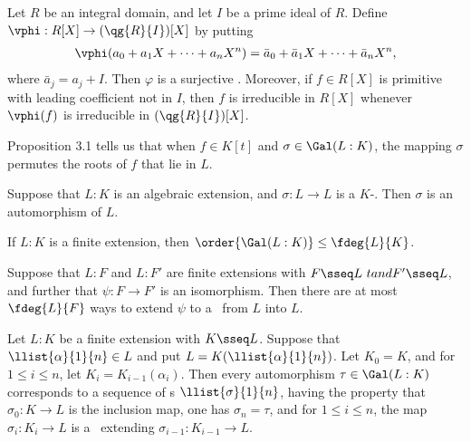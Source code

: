 \documentclass[a4paper]{article}
\begin{document}
\begin{ttheorem}
  Let \( R \) be an integral domain, and let \( I \) be a prime ideal of \( R \).
  Define \( \vphi:R[X]\to (\qg{R}{I})[X] \) by putting \begin{align*}
    \vphi(a_0+a_1X+\cdots+a_nX^n) =\bar a_0+\bar a_1X+\cdots+\bar a_nX^n,
  \end{align*}
  where \( \bar a_j = a_j + I \).
  Then \( \varphi \) is a surjective \homo.
  Moreover, if \( f\in R[X] \) is primitive with leading coefficient not in \( I \), then \( f \) is irreducible in \( R[X] \) whenever \( \vphi(f) \) is irreducible in \( (\qg{R}{I})[X] \).
\end{ttheorem}

\quad Proposition 3.1 tells us that when \( f\in K[t] \) and \( \sigma\in \Gal(L:K) \), the mapping \( \sigma \) permutes the roots of \( f \) that lie in \( L \).

\begin{ttheorem}
  Suppose that \( L:K \) is an algebraic extension, and \( \sigma:L\to L \) is a \( K \)-\homo.
  Then \( \sigma \) is an automorphism of \( L \).
\end{ttheorem}

\begin{ttheorem}
  If \( L:K \) is a finite extension, then \( \order{\Gal(L:K)}\leq \fdeg{L}{K} \).
\end{ttheorem}

\begin{tcorollary}
  Suppose that \( L:F \) and \( L:F' \) are finite extensions with \( F\sseq L\ tand F'\sseq L \), and further that \( \psi:F\to F' \) is an isomorphism.
  Then there are at most \( \fdeg{L}{F} \) ways to extend \( \psi \) to a \homo~from \( L \) into \( L \).
\end{tcorollary}

\begin{tcorollary}
  Let \( L:K \) be a finite extension with \( K\sseq L \).
  Suppose that \( \llist{\alpha}{1}{n}\in L \) and put \( L=K(\llist{\alpha}{1}{n}) \).
  Let \( K_0 = K \), and for \( 1\leq i\leq n \), let \( K_i = K_{i-1}(\alpha_i) \).
  Then every automorphism \( \tau \in \Gal(L:K) \) corresponds to a sequence of \homo s \( \llist{\sigma}{1}{n} \), having the property that \( \sigma_0:K\to L \) is the inclusion map, one has \( \sigma_n=\tau \), and for \( 1\leq i\leq n \), the map \( \sigma_i : K_i\to L \) is a \homo~extending \( \sigma_{i-1}:K_{i-1}\to L \).
\end{tcorollary}
\end{document}
